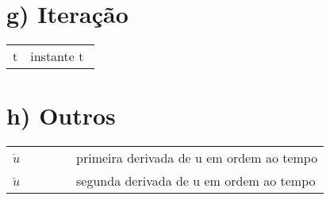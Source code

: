 \section*{g) Iteração}
    \begin{flushleft}
        \begin{tabular}{l p{0.8\linewidth}}
        t     & instante t
        \end{tabular}
    \end{flushleft}
    
\section*{h) Outros}
    \begin{flushleft}
        \begin{tabular}{l p{0.8\linewidth}}
        $\dot{u}$     & primeira derivada de u em ordem ao tempo\\
        $\ddot{u}$    & segunda derivada de u em ordem ao tempo
        \end{tabular}
    \end{flushleft}